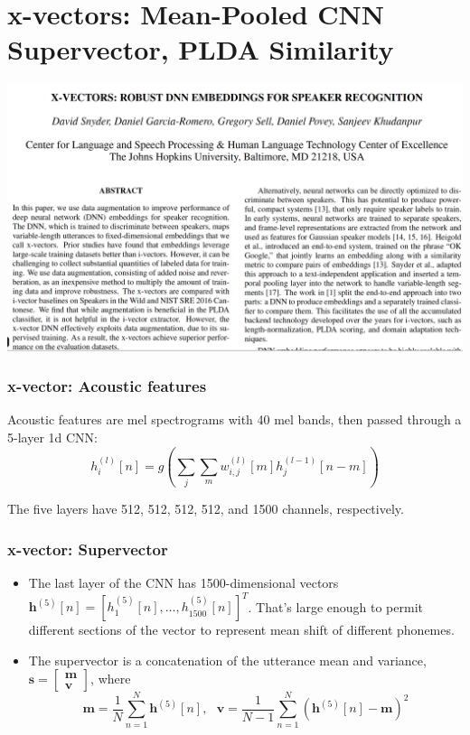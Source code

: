 \documentclass{beamer}
\begin{document}
\section[x-vectors]{x-vectors: Mean-Pooled CNN Supervector, PLDA Similarity}
\setcounter{subsection}{1}

\begin{frame}
  \centerline{\includegraphics[width=\textwidth]{figs/snyder2018page1.png}}
\end{frame}

\begin{frame}
  \frametitle{x-vector: Acoustic features}

  Acoustic features are mel spectrograms with 40 mel bands, then
  passed through a 5-layer 1d CNN:
  \begin{displaymath}
    h^{(l)}_i[n] = g\left(\sum_{j}\sum_{m} w^{(l)}_{i,j}[m]h^{(l-1)}_j[n-m]\right)
  \end{displaymath}

  The five layers have 512, 512, 512, 512, and 1500 channels, respectively.
\end{frame}

\begin{frame}
  \frametitle{x-vector: Supervector}

  \begin{itemize}
    \item 
      The last layer of the CNN has 1500-dimensional vectors
      $\bm{h}^{(5)}[n]=[h^{(5)}_1[n],\ldots,h^{(5)}_{1500}[n]]^T$.
      That's large enough to permit different sections of the vector
      to represent mean shift of different phonemes.
    \item
      The supervector is a concatenation of the utterance mean and
      variance,
      $\bm{s}=\left[\begin{array}{c}\bm{m}\\\bm{v}\end{array}\right]$,
      where
      \begin{displaymath}
        \bm{m}=\frac{1}{N}\sum_{n=1}^N\bm{h}^{(5)}[n],~~~
        \bm{v}=\frac{1}{N-1}\sum_{n=1}^N\left(\bm{h}^{(5)}[n]-\bm{m}\right)^2
      \end{displaymath}
  \end{itemize}
\end{frame}
\end{document}
